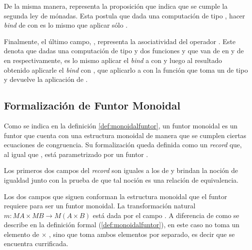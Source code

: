 De la misma manera,  representa la proposición que indica que se cumple la segunda ley de mónadas. Esta postula que dada una computación  de tipo , hacer \textit{bind} de  con  es lo mismo que aplicar sólo . 

Finalmente, el último campo, , representa la asociatividad del operador \hbox{\AgdaField{$\_\gg=\_$}}. Este denota que dadas una computación  de tipo  y dos funciones  y  que van de  en  y de  en  respectivamente, es lo mismo aplicar el \textit{bind} a  con  y luego al resultado obtenido aplicarle el \textit{bind} con , que aplicarlo a  con la función que toma un  de tipo  y devuelve la aplicación de  \AgdaField{$\gg=$} .

\subsection{Formalización de Funtor Monoidal}\label{funtmon:funt}

Como se indica en la definición \ref{def:monoidalfuntor}, un funtor monoidal es un funtor que cuenta con una estructura monoidal de manera que se cumplen ciertas ecuaciones de congruencia. Su formalización queda definida como un \textit{record} que, al igual que , está parametrizado por un funtor  \AgdaSymbol{:}  \AgdaSymbol{$\rightarrow$} . 


Los primeros dos campos del \textit{record} son iguales a los de  y brindan la noción de igualdad junto con la prueba de que tal noción es una relación de equivalencia. 

Los dos campos que siguen conforman la estructura monoidal que el funtor requiere para ser un funtor monoidal. La transformación natural $m : \mathit{M} A \times \mathit{M} B \rightarrow \mathit{M} (A \times B)$ está dada por el campo . A diferencia de como se describe en la definición formal (\ref{def:monoidalfuntor}), en este caso  no toma un elemento de  $\times$ , sino que toma ambos elementos por separado, es decir que se encuentra currificada. 


